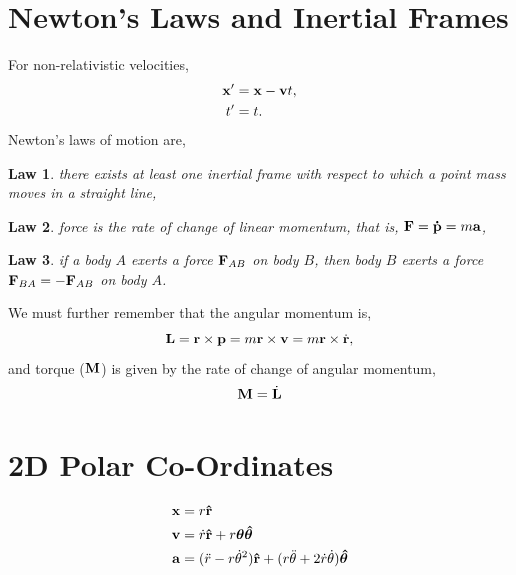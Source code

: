 \documentclass{book}
\newtheorem{law}{Law}
\begin{document}
\section{Newton's Laws and Inertial Frames}
For non-relativistic velocities,
\begin{equation}
    \begin{split}
    \vb{x}' & = \vb{x} - \vb{v}t, \\
    t' & = t.
    \end{split}
\end{equation}
Newton's laws of motion are,
\begin{law}
    there exists at least one inertial frame with respect to which a point mass moves
in a straight line,
\end{law}
\begin{law}
    force is the rate of change of linear momentum, that is, $\vb{F} = \vb{\Dot{p}} = m\vb{a}$,
\end{law}
\begin{law}
    if a body $A$ exerts a force $\vb{F}_{AB}$ on body $B$, then body $B$ exerts a force $\vb{F}_{BA} = -\vb{F}_{AB}$ on body $A$.
\end{law}
We must further remember that the angular momentum is, 
\begin{equation}
    \vb{L} = \vb{r} \times \vb{p} = m\vb{r} \times \vb{v} = m\vb{r} \times \Dot{\vb{r}},
\end{equation}
and torque ($\vb{M}$) is given by the rate of change of angular momentum,
\begin{equation}
    \vb{M} = \Dot{\vb{L}}
\end{equation}
\section{2D Polar Co-Ordinates}
\begin{align}
    \vb{x} &= r\vu{r}\\
    \vb{v} &= \Dot{r}\vu{r} + r\vb*{\theta}\vu*{\theta} \\
    \vb{a} &= (\Ddot{r} - r\Dot{\theta}^2)\vu{r} + (r\Ddot{\theta} + 2\Dot{r}\Dot{\theta})\vu*{\theta}
\end{align}
\end{document}
